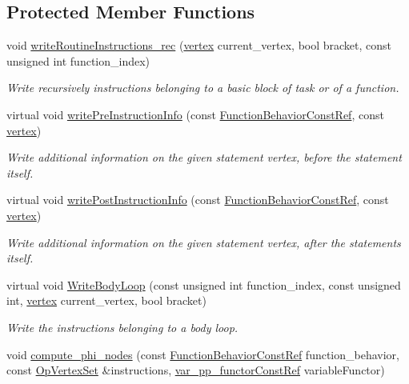 \subsection*{Protected Member Functions}
\begin{DoxyCompactItemize}
\item 
void \hyperlink{classCWriter_a10d0233fea0a92085a3aa160b9e39845}{write\+Routine\+Instructions\+\_\+rec} (\hyperlink{graph_8hpp_abefdcf0544e601805af44eca032cca14}{vertex} current\+\_\+vertex, bool bracket, const unsigned int function\+\_\+index)
\begin{DoxyCompactList}\small\item\em Write recursively instructions belonging to a basic block of task or of a function. \end{DoxyCompactList}\item 
virtual void \hyperlink{classCWriter_a89fcc230d50a8b5087a08348b67b470a}{write\+Pre\+Instruction\+Info} (const \hyperlink{function__behavior_8hpp_a94872da12ed056b6ecf90456164e0213}{Function\+Behavior\+Const\+Ref}, const \hyperlink{graph_8hpp_abefdcf0544e601805af44eca032cca14}{vertex})
\begin{DoxyCompactList}\small\item\em Write additional information on the given statement vertex, before the statement itself. \end{DoxyCompactList}\item 
virtual void \hyperlink{classCWriter_ad32d1e42246eafd2825029065ccd6280}{write\+Post\+Instruction\+Info} (const \hyperlink{function__behavior_8hpp_a94872da12ed056b6ecf90456164e0213}{Function\+Behavior\+Const\+Ref}, const \hyperlink{graph_8hpp_abefdcf0544e601805af44eca032cca14}{vertex})
\begin{DoxyCompactList}\small\item\em Write additional information on the given statement vertex, after the statements itself. \end{DoxyCompactList}\item 
virtual void \hyperlink{classCWriter_a37dbe13948ff32204ff5030b9400ec84}{Write\+Body\+Loop} (const unsigned int function\+\_\+index, const unsigned int, \hyperlink{graph_8hpp_abefdcf0544e601805af44eca032cca14}{vertex} current\+\_\+vertex, bool bracket)
\begin{DoxyCompactList}\small\item\em Write the instructions belonging to a body loop. \end{DoxyCompactList}\item 
void \hyperlink{classCWriter_a5d4cb518818feb0e8ef025fa7b93b123}{compute\+\_\+phi\+\_\+nodes} (const \hyperlink{function__behavior_8hpp_a94872da12ed056b6ecf90456164e0213}{Function\+Behavior\+Const\+Ref} function\+\_\+behavior, const \hyperlink{classOpVertexSet}{Op\+Vertex\+Set} \&instructions, \hyperlink{var__pp__functor_8hpp_a8a6b51b6519401d911398943510557f0}{var\+\_\+pp\+\_\+functor\+Const\+Ref} variable\+Functor)

\end{DoxyCompactItemize}
